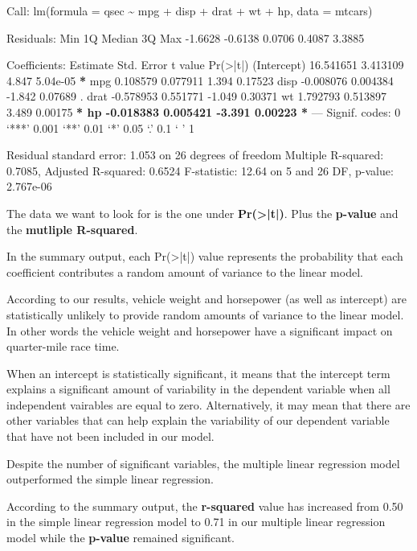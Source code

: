 \documentclass[11pt]{article}
\begin{document}
\begin{org}


Call:
lm(formula = qsec \textasciitilde{} mpg + disp + drat + wt + hp, data = mtcars)

Residuals:
    Min      1Q  Median      3Q     Max
-1.6628 -0.6138  0.0706  0.4087  3.3885

Coefficients:
             Estimate Std. Error t value Pr(>|t|)
(Intercept) 16.541651   3.413109   4.847 5.04e-05 \textbf{*}
mpg          0.108579   0.077911   1.394  0.17523
disp        -0.008076   0.004384  -1.842  0.07689 .
drat        -0.578953   0.551771  -1.049  0.30371
wt           1.792793   0.513897   3.489  0.00175 \textbf{*
hp          -0.018383   0.005421  -3.391  0.00223 *}
---
Signif. codes:  0 ‘***’ 0.001 ‘**’ 0.01 ‘*’ 0.05 ‘.’ 0.1 ‘ ’ 1

Residual standard error: 1.053 on 26 degrees of freedom
Multiple R-squared:  0.7085,	Adjusted R-squared:  0.6524
F-statistic: 12.64 on 5 and 26 DF,  p-value: 2.767e-06
\end{org}

The data we want to look for is the one under \textbf{Pr(>|t|)}. Plus the \textbf{p-value} and the \textbf{mutliple R-squared}.

In the summary output, each Pr(>|t|) value represents the probability that each coefficient contributes a random amount of variance to the linear model.

According to our results, vehicle weight and horsepower (as well as intercept) are statistically unlikely to provide random amounts of variance to the linear model. In other words the vehicle weight and horsepower have a significant impact on quarter-mile race time.

When an intercept is statistically significant, it means that the intercept term explains a significant amount of variability in the dependent variable when all independent vairables are equal to zero. Alternatively, it may mean that there are other variables that can help explain the variability of our dependent variable that have not been included in our model.

Despite the number of significant variables, the multiple linear regression model outperformed the simple linear regression.

According to the summary output, the \textbf{r-squared} value has increased from 0.50 in the simple linear regression model to 0.71 in our multiple linear regression model while the \textbf{p-value} remained significant.
\end{document}
